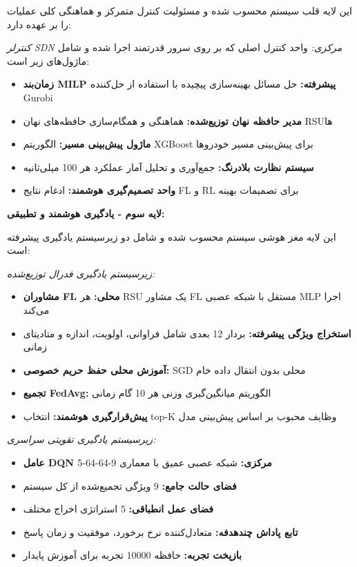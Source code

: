 \documentclass[11pt]{article}
\newcommand{\فصل}[1]{\section{#1}}
\newcommand{\قسمت}[1]{\subsection{#1}}
\begin{document}
این لایه قلب سیستم محسوب شده و مسئولیت کنترل متمرکز و هماهنگی کلی عملیات را بر عهده دارد:

\textit{کنترلر SDN مرکزی:} واحد کنترل اصلی که بر روی سرور قدرتمند اجرا شده و شامل ماژول‌های زیر است:
\begin{itemize}
\item \textbf{زمان‌بند MILP پیشرفته:} حل مسائل بهینه‌سازی پیچیده با استفاده از حل‌کننده Gurobi
\item \textbf{مدیر حافظه نهان توزیع‌شده:} هماهنگی و همگام‌سازی حافظه‌های نهان RSUها
\item \textbf{ماژول پیش‌بینی مسیر:} الگوریتم XGBoost برای پیش‌بینی مسیر خودروها
\item \textbf{سیستم نظارت بلادرنگ:} جمع‌آوری و تحلیل آمار عملکرد هر 100 میلی‌ثانیه
\item \textbf{واحد تصمیم‌گیری هوشمند:} ادغام نتایج FL و RL برای تصمیمات بهینه
\end{itemize}

\textbf{لایه سوم - یادگیری هوشمند و تطبیقی:}

این لایه مغز هوشی سیستم محسوب شده و شامل دو زیرسیستم یادگیری پیشرفته است:

\textit{زیرسیستم یادگیری فدرال توزیع‌شده:}
\begin{itemize}
\item \textbf{مشاوران FL محلی:} هر RSU یک مشاور FL مستقل با شبکه عصبی MLP اجرا می‌کند
\item \textbf{استخراج ویژگی پیشرفته:} بردار 12 بعدی شامل فراوانی، اولویت، اندازه و متادیتای زمانی
\item \textbf{آموزش محلی حفظ حریم خصوصی:} SGD محلی بدون انتقال داده خام
\item \textbf{تجمیع FedAvg:} الگوریتم میانگین‌گیری وزنی هر 10 گام زمانی
\item \textbf{پیش‌قرارگیری هوشمند:} انتخاب top-K وظایف محبوب بر اساس پیش‌بینی مدل
\end{itemize}

\textit{زیرسیستم یادگیری تقویتی سراسری:}
\begin{itemize}
\item \textbf{عامل DQN مرکزی:} شبکه عصبی عمیق با معماری 9-64-64-5
\item \textbf{فضای حالت جامع:} 9 ویژگی تجمیع‌شده از کل سیستم
\item \textbf{فضای عمل انطباقی:} 5 استراتژی اخراج مختلف
\item \textbf{تابع پاداش چندهدفه:} متعادل‌کننده نرخ برخورد، موفقیت و زمان پاسخ
\item \textbf{بازپخت تجربه:} حافظه 10000 تجربه برای آموزش پایدار
\end{itemize}
\end{document}
